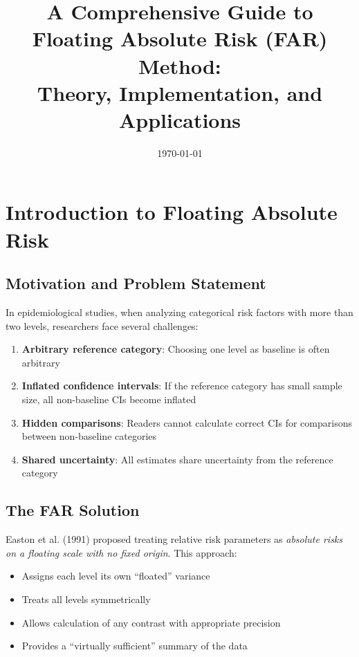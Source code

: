 \documentclass[11pt]{article}
\title{A Comprehensive Guide to Floating Absolute Risk (FAR) Method: \\
Theory, Implementation, and Applications}
\author{}
\date{\today}
\begin{document}
\maketitle

\tableofcontents
\newpage

\section{Introduction to Floating Absolute Risk}

\subsection{Motivation and Problem Statement}

In epidemiological studies, when analyzing categorical risk factors with more than two levels, researchers face several challenges:

\begin{enumerate}
    \item \textbf{Arbitrary reference category}: Choosing one level as baseline is often arbitrary
    \item \textbf{Inflated confidence intervals}: If the reference category has small sample size, all non-baseline CIs become inflated
    \item \textbf{Hidden comparisons}: Readers cannot calculate correct CIs for comparisons between non-baseline categories
    \item \textbf{Shared uncertainty}: All estimates share uncertainty from the reference category
\end{enumerate}

\subsection{The FAR Solution}

Easton et al. (1991) proposed treating relative risk parameters as \textit{absolute risks on a floating scale with no fixed origin}. This approach:
\begin{itemize}
    \item Assigns each level its own ``floated'' variance
    \item Treats all levels symmetrically
    \item Allows calculation of any contrast with appropriate precision
    \item Provides a ``virtually sufficient'' summary of the data
\end{itemize}
\end{document}
